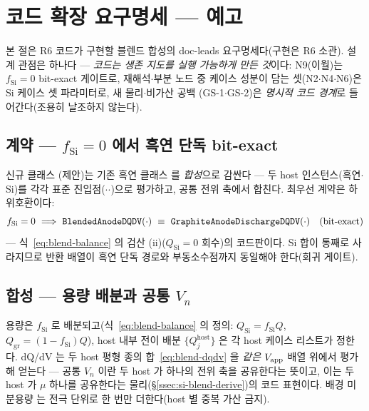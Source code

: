 \section{코드 확장 요구명세 ---  예고}\label{sec:si-code}
본 절은 R6 코드가 구현할 블렌드 합성의 doc-leads 요구명세다(구현은 R6 소관). 설계 관점은 하나다 ---
\emph{코드는 생존 지도를 실행 가능하게 만든 것}이다: N9(이월)는 $f_\mathrm{Si}{=}0$ bit-exact
게이트로, 재해석$\cdot$부분 노드 중 케이스 성분이 담는 셋(N2$\cdot$N4$\cdot$N6)은 Si 케이스 셋 파라미터로, 새 물리$\cdot$비가산 공백
(GS-1$\cdot$GS-2)은 \emph{명시적 코드 경계}로 들어간다(조용히 날조하지 않는다).

\subsection{계약 --- $f_\mathrm{Si}{=}0$ 에서 흑연 단독 bit-exact}\label{ssec:code-contract}
신규 클래스 (제안)는 기존 흑연 클래스
 를 \emph{합성}으로 감싼다 --- 두 host 인스턴스(흑연$\cdot$Si)를 각각
표준 진입점($\cdot$$\cdot$)으로 평가하고, 공통 전위 축에서
합친다. 최우선 계약은 하위호환이다:
\begin{equation}
f_\mathrm{Si}=0\ \Longrightarrow\ \code{BlendedAnodeDQDV}(\cdot)\ \equiv\ \code{GraphiteAnodeDischargeDQDV}(\cdot)
\quad(\text{bit-exact})
\label{eq:si-code-bitexact}
\end{equation}
--- 식~\eqref{eq:blend-balance} 의 검산 (ii)($Q_\mathrm{Si}{=}0$ 회수)의 코드판이다. Si 합이 통째로
사라지므로 반환 배열이 흑연 단독 경로와 부동소수점까지 동일해야 한다(회귀 게이트).

\subsection{합성 --- 용량 배분과 공통 $V_n$}\label{ssec:code-synth}
용량은 $f_\mathrm{Si}$ 로 배분되고(식~\eqref{eq:blend-balance} 의 정의: $Q_\mathrm{Si}{=}f_\mathrm{Si}Q$,
$Q_\mathrm{gr}{=}(1{-}f_\mathrm{Si})Q$), host 내부 전이 배분 $\{Q_j^{\mathrm{host}}\}$ 은 각 host 케이스
리스트가 정한다. dQ/dV 는 두 host 평형 종의 합~\eqref{eq:blend-dqdv} 을 \emph{같은} $V_{\mathrm{app}}$ 배열
위에서 평가해 얻는다 --- 공통 $V_n$ 이란 두 host 가 하나의 전위 축을 공유한다는 뜻이고, 이는 두 host 가
$\mu$ 하나를 공유한다는 물리(\S\ref{ssec:si-blend-derive})의 코드 표현이다. 배경 미분용량  는
전극 단위로 한 번만 더한다(host 별 중복 가산 금지).

